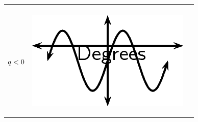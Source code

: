 \begin{center}
\begin{xtabular*}{\mytablewidth}[t]{|p{10\mystarwidth}|p{10\mystarwidth}|p{10\mystarwidth}|}
\begin{center}
      \vspace{2pt}
    \vspace{.1in}
    
    \end{center}



    \addtocounter{footnote}{-0}
    
     \tabularnewline{}
    
    
        
                  \begin{math}q<{}0\end{math}
                 &
    
    
        
                  
    \setcounter{subfigure}{0}

\label{m39414*id85421}
    \begin{center}
    \label{m39414*id85421!!!underscore!!!media}\label{m39414*id85421!!!underscore!!!printimage}\includegraphics{col11306.imgs/m39414_MG10C15_021.png} %
        
      \vspace{2pt}
    \vspace{.1in}
    
    \end{center}



    \addtocounter{footnote}{-0}
    

\end{xtabular*}
\end{center}
